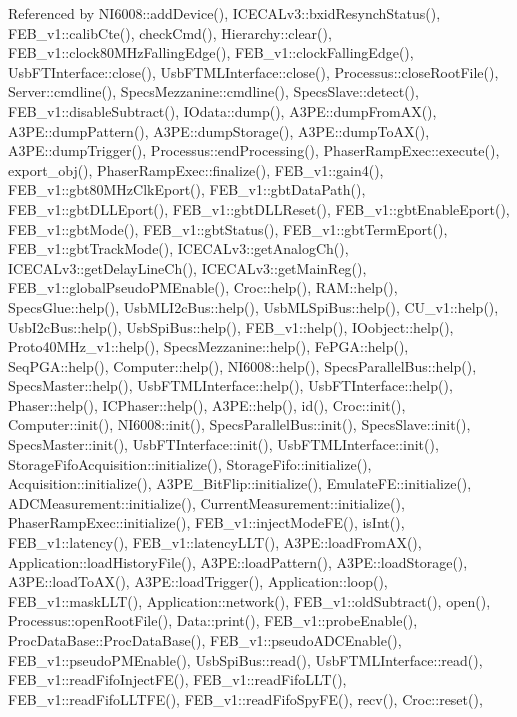 Referenced by N\+I6008\+::add\+Device(), I\+C\+E\+C\+A\+Lv3\+::bxid\+Resynch\+Status(), F\+E\+B\+\_\+v1\+::calib\+Cte(), check\+Cmd(), Hierarchy\+::clear(), F\+E\+B\+\_\+v1\+::clock80\+M\+Hz\+Falling\+Edge(), F\+E\+B\+\_\+v1\+::clock\+Falling\+Edge(), Usb\+F\+T\+Interface\+::close(), Usb\+F\+T\+M\+L\+Interface\+::close(), Processus\+::close\+Root\+File(), Server\+::cmdline(), Specs\+Mezzanine\+::cmdline(), Specs\+Slave\+::detect(), F\+E\+B\+\_\+v1\+::disable\+Subtract(), I\+Odata\+::dump(), A3\+P\+E\+::dump\+From\+A\+X(), A3\+P\+E\+::dump\+Pattern(), A3\+P\+E\+::dump\+Storage(), A3\+P\+E\+::dump\+To\+A\+X(), A3\+P\+E\+::dump\+Trigger(), Processus\+::end\+Processing(), Phaser\+Ramp\+Exec\+::execute(), export\+\_\+obj(), Phaser\+Ramp\+Exec\+::finalize(), F\+E\+B\+\_\+v1\+::gain4(), F\+E\+B\+\_\+v1\+::gbt80\+M\+Hz\+Clk\+Eport(), F\+E\+B\+\_\+v1\+::gbt\+Data\+Path(), F\+E\+B\+\_\+v1\+::gbt\+D\+L\+L\+Eport(), F\+E\+B\+\_\+v1\+::gbt\+D\+L\+L\+Reset(), F\+E\+B\+\_\+v1\+::gbt\+Enable\+Eport(), F\+E\+B\+\_\+v1\+::gbt\+Mode(), F\+E\+B\+\_\+v1\+::gbt\+Status(), F\+E\+B\+\_\+v1\+::gbt\+Term\+Eport(), F\+E\+B\+\_\+v1\+::gbt\+Track\+Mode(), I\+C\+E\+C\+A\+Lv3\+::get\+Analog\+Ch(), I\+C\+E\+C\+A\+Lv3\+::get\+Delay\+Line\+Ch(), I\+C\+E\+C\+A\+Lv3\+::get\+Main\+Reg(), F\+E\+B\+\_\+v1\+::global\+Pseudo\+P\+M\+Enable(), Croc\+::help(), R\+A\+M\+::help(), Specs\+Glue\+::help(), Usb\+M\+L\+I2c\+Bus\+::help(), Usb\+M\+L\+Spi\+Bus\+::help(), C\+U\+\_\+v1\+::help(), Usb\+I2c\+Bus\+::help(), Usb\+Spi\+Bus\+::help(), F\+E\+B\+\_\+v1\+::help(), I\+Oobject\+::help(), Proto40\+M\+Hz\+\_\+v1\+::help(), Specs\+Mezzanine\+::help(), Fe\+P\+G\+A\+::help(), Seq\+P\+G\+A\+::help(), Computer\+::help(), N\+I6008\+::help(), Specs\+Parallel\+Bus\+::help(), Specs\+Master\+::help(), Usb\+F\+T\+M\+L\+Interface\+::help(), Usb\+F\+T\+Interface\+::help(), Phaser\+::help(), I\+C\+Phaser\+::help(), A3\+P\+E\+::help(), id(), Croc\+::init(), Computer\+::init(), N\+I6008\+::init(), Specs\+Parallel\+Bus\+::init(), Specs\+Slave\+::init(), Specs\+Master\+::init(), Usb\+F\+T\+Interface\+::init(), Usb\+F\+T\+M\+L\+Interface\+::init(), Storage\+Fifo\+Acquisition\+::initialize(), Storage\+Fifo\+::initialize(), Acquisition\+::initialize(), A3\+P\+E\+\_\+\+Bit\+Flip\+::initialize(), Emulate\+F\+E\+::initialize(), A\+D\+C\+Measurement\+::initialize(), Current\+Measurement\+::initialize(), Phaser\+Ramp\+Exec\+::initialize(), F\+E\+B\+\_\+v1\+::inject\+Mode\+F\+E(), is\+Int(), F\+E\+B\+\_\+v1\+::latency(), F\+E\+B\+\_\+v1\+::latency\+L\+L\+T(), A3\+P\+E\+::load\+From\+A\+X(), Application\+::load\+History\+File(), A3\+P\+E\+::load\+Pattern(), A3\+P\+E\+::load\+Storage(), A3\+P\+E\+::load\+To\+A\+X(), A3\+P\+E\+::load\+Trigger(), Application\+::loop(), F\+E\+B\+\_\+v1\+::mask\+L\+L\+T(), Application\+::network(), F\+E\+B\+\_\+v1\+::old\+Subtract(), open(), Processus\+::open\+Root\+File(), Data\+::print(), F\+E\+B\+\_\+v1\+::probe\+Enable(), Proc\+Data\+Base\+::\+Proc\+Data\+Base(), F\+E\+B\+\_\+v1\+::pseudo\+A\+D\+C\+Enable(), F\+E\+B\+\_\+v1\+::pseudo\+P\+M\+Enable(), Usb\+Spi\+Bus\+::read(), Usb\+F\+T\+M\+L\+Interface\+::read(), F\+E\+B\+\_\+v1\+::read\+Fifo\+Inject\+F\+E(), F\+E\+B\+\_\+v1\+::read\+Fifo\+L\+L\+T(), F\+E\+B\+\_\+v1\+::read\+Fifo\+L\+L\+T\+F\+E(), F\+E\+B\+\_\+v1\+::read\+Fifo\+Spy\+F\+E(), recv(), Croc\+::reset(), 
